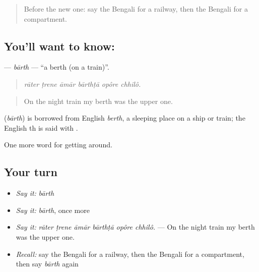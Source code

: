 \label{lesson:BN-C384-barth}



\begin{quote}
Before the new one: say the Bengali for a railway, then the Bengali for a compartment.
\end{quote}

\subsection*{You'll want to know: }
\textbf{} — \emph{bārth} — \textquotedblleft{}a berth (on a train)\textquotedblright{}.

\begin{quote}
     
\end{quote}

\begin{quote}
\emph{rāter ṭrene āmār bārthṭā opôre chhilô.}
\end{quote}

\begin{quote}
On the night train my berth was the upper one.
\end{quote}

\begin{cousinweb}
\textbf{} (\emph{bārth}) is borrowed from English \emph{berth}, a sleeping place on a ship or train; the English th is said with .
\end{cousinweb}

\begin{grammarlens}[title={What you've built}]
One more word for getting around.
\end{grammarlens}

\subsection*{Your turn}
\begin{itemize}
\raggedright
  \item \emph{Say it:} \emph{bārth}
  \item \emph{Say it:} \emph{bārth}, once more
  \item \emph{Say it:} \emph{rāter ṭrene āmār bārthṭā opôre chhilô.} — On the night train my berth was the upper one.
  \item \emph{Recall:} say the Bengali for a railway, then the Bengali for a compartment, then say \emph{bārth} again
\end{itemize}

